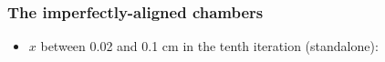 \documentclass[compress]{beamer}
\begin{document}
\begin{frame}
\begin{columns}
\end{columns}
\end{frame}

\begin{frame}
\frametitle{The imperfectly-aligned chambers}
\begin{itemize}
\item $x$ between 0.02 and 0.1 cm in the tenth iteration (standalone):
\end{itemize}

\vfill
\begin{columns}

\end{columns}
\end{frame}
\end{document}
